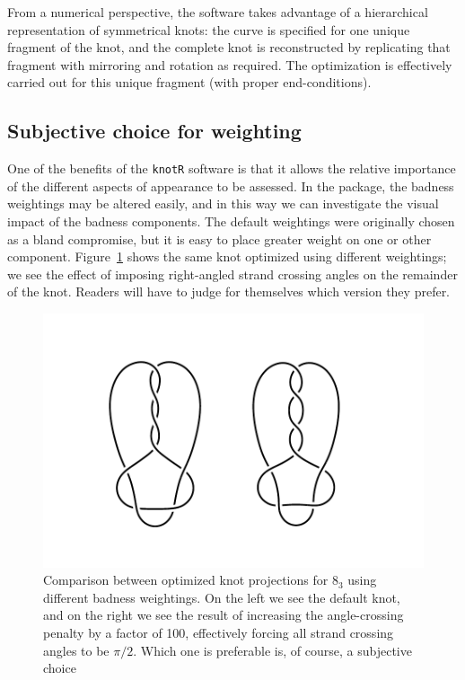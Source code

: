 \documentclass{birkjour}
\theoremstyle{definition}
\theoremstyle{remark}
\numberwithin{equation}{section}
\begin{document}
From a numerical perspective, the software takes advantage of a
hierarchical representation of symmetrical knots: the curve is
specified for one unique fragment of the knot, and the complete knot
is reconstructed by replicating that fragment with mirroring and
rotation as required.  The optimization is effectively carried out for
this unique fragment (with proper end-conditions).  

\subsection{Subjective \label{section_cca} choice for weighting}


One of the benefits of the {\tt knotR} software is that it allows the
relative importance of the different aspects of appearance to be
assessed.  In the package, the badness weightings may be altered
easily, and in this way we can investigate the visual impact of the
badness components.  The default weightings were originally chosen as
a bland compromise, but it is easy to place greater weight on one or
other component.  Figure~\ref{figure_cca} shows the same knot optimized
using different weightings; we see the effect of imposing right-angled
strand crossing angles on the remainder of the knot.  Readers will
have to judge for themselves which version they prefer.

\begin{figure}[htbp]
  \begin{center}
\includegraphics[width=13cm]{compare_crossing_angles}  %
\caption{Comparison between optimized knot projections for $8_3$
  \label{figure_cca} using different  badness weightings.  On the
  left we see the default knot, and on the right we see the result of
  increasing the angle-crossing penalty by a factor of 100,
  effectively forcing all strand crossing angles to be $\pi/2$.  Which
  one is preferable is, of course, a subjective choice}
  \end{center}
\end{figure}
\end{document}
